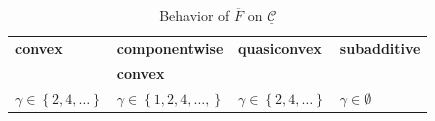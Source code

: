 \documentclass{article}
\theoremstyle{case}
\begin{document}
\label{tab:tab0}
\begin{table}
\begin{center}
\caption{Behavior of $\overline{F} \text{ on } \underline{\mathcal{C}}$}
  \begin{tabular}{l|l|l|l}
    \textbf{convex} & \textbf{componentwise} & \textbf{quasiconvex} & \textbf{subadditive} \\
     & \textbf{convex} & \\
    \hline
	 $\gamma \in \left\lbrace 2, 4, \dots \right\rbrace$ & $\gamma \in \left\lbrace 1, 2, 4, \dots, \right\rbrace$ & $\gamma \in \left\lbrace 2, 4, \dots\right\rbrace$ & $\gamma \in \emptyset$ \\    
  \end{tabular}
\end{center}
\end{table}
\end{document}
